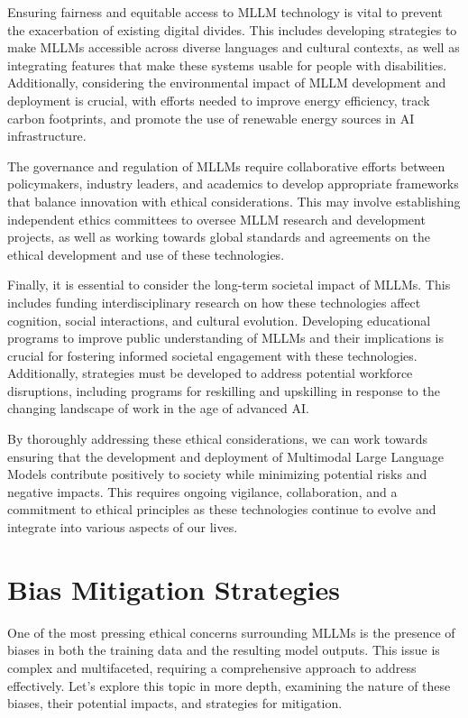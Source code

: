 Ensuring fairness and equitable access to MLLM technology is vital to prevent the exacerbation of existing digital divides\cite{ray2023chatgpt}. This includes developing strategies to make MLLMs accessible across diverse languages and cultural contexts, as well as integrating features that make these systems usable for people with disabilities. Additionally, considering the environmental impact of MLLM development and deployment is crucial, with efforts needed to improve energy efficiency, track carbon footprints, and promote the use of renewable energy sources in AI infrastructure.

The governance and regulation of MLLMs require collaborative efforts between policymakers, industry leaders, and academics to develop appropriate frameworks that balance innovation with ethical considerations. This may involve establishing independent ethics committees to oversee MLLM research and development projects, as well as working towards global standards and agreements on the ethical development and use of these technologies\cite{rosenstrauch2023artificial}.

Finally, it is essential to consider the long-term societal impact of MLLMs. This includes funding interdisciplinary research on how these technologies affect cognition, social interactions, and cultural evolution. Developing educational programs to improve public understanding of MLLMs and their implications is crucial for fostering informed societal engagement with these technologies. Additionally, strategies must be developed to address potential workforce disruptions, including programs for reskilling and upskilling in response to the changing landscape of work in the age of advanced AI.

By thoroughly addressing these ethical considerations, we can work towards ensuring that the development and deployment of Multimodal Large Language Models contribute positively to society while minimizing potential risks and negative impacts. This requires ongoing vigilance, collaboration, and a commitment to ethical principles as these technologies continue to evolve and integrate into various aspects of our lives.

\section{Bias Mitigation Strategies}

One of the most pressing ethical concerns surrounding MLLMs is the presence of biases in both the training data and the resulting model outputs. This issue is complex and multifaceted, requiring a comprehensive approach to address effectively. Let's explore this topic in more depth, examining the nature of these biases, their potential impacts, and strategies for mitigation.

